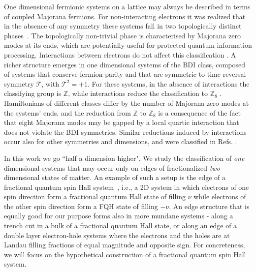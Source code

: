 \documentclass[twocolumn,aps,prb,showpacs]{revtex4-1}
\begin{document}
One dimensional fermionic systems on a lattice may always be described in terms of coupled Majorana fermions. For non-interacting electrons it was realized that in the absence of any symmetry these systems fall in two topologically distinct phases~\cite{Hasan2010,Qi2011,Alicea2012,Stanescu2013}.
The topologically non-trivial phase is characterised by Majorana zero modes at its ends, which  are potentially useful for  protected quantum information processing. Interactions between electrons do not affect this classification \cite{Gangadharaiah2011,Fidkowski2011b,Stoudenmire2011,Sela2011}.
A richer structure emerges in one dimensional systems of the BDI class, composed of systems that conserve fermion parity and that are symmetric  to time reversal symmetry $\mathcal{T}$, with $\mathcal{T}^2=+1$. For these systems, in the absence of interactions the classifying group is $\mathbb{Z}$, while interactions reduce the classification to $\mathbb{Z}_8$ \cite{Fidkowski2010,Turner2011,Fidkowski2011a}. Hamiltonians of different classes differ by the number of Majorana zero modes at the systems' ends, and the reduction from $\mathbb{Z}$ to $\mathbb{Z}_8$ is a consequence of the fact that eight Majorana modes may be gapped by a local quartic interaction that does not violate the BDI symmetries. Similar reductions induced by interactions occur also for other symmetries and dimensions, and were classified in Refs. .

In this work we go ``half a dimension higher". We study the classification of {\it one} dimensional systems that may occur only on edges of fractionalized {\it two} dimensional states of matter. 
An example of such a setup is the edge of a fractional quantum spin Hall system~\cite{Levin2009,Stern2016}, i.e., a 2D system in which electrons of one spin direction form a fractional quantum Hall state of filling $\nu$ while electrons of the other spin direction form a FQH state of filling $-\nu$. An edge structure that is equally good for our purpose forms also in more mundane systems - along a trench cut in a bulk of a fractional quantum Hall state, or along an edge of a double layer electron-hole systems where the electrons and the holes are at Landau filling fractions of equal magnitude and opposite sign. For concreteness, we will focus on the hypothetical construction of a fractional quantum spin Hall system.
\end{document}
